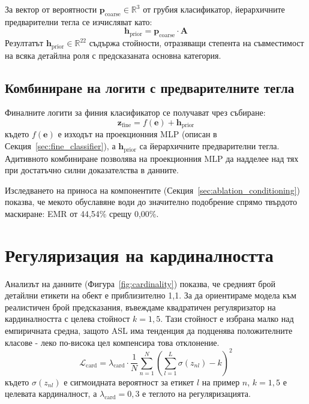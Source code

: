 \documentclass[12pt,a4paper]{report}
\begin{document}
За вектор от вероятности $\mathbf{p}_{\text{coarse}} \in \mathbb{R}^3$ от грубия класификатор, йерархичните предварителни тегла се изчисляват като:
\begin{equation}
  \mathbf{h}_{\text{prior}} = \mathbf{p}_{\text{coarse}} \cdot \mathbf{A}
  \label{eq:hierarchy_prior}
\end{equation}
Резултатът $\mathbf{h}_{\text{prior}} \in \mathbb{R}^{22}$ съдържа стойности, отразяващи степента на съвместимост на всяка детайлна роля с предсказаната основна категория.

\subsection{Комбиниране на логити с предварителните тегла}

Финалните логити за финия класификатор се получават чрез събиране:
\begin{equation}
  \mathbf{z}_{\text{fine}} = f(\mathbf{e}) + \mathbf{h}_{\text{prior}}
  \label{eq:fine_logits}
\end{equation}
където $f(\mathbf{e})$ е изходът на проекционния MLP (описан в Секция~\ref{sec:fine_classifier}), а $\mathbf{h}_{\text{prior}}$ са йерархичните предварителни тегла. Адитивното комбиниране позволява на проекционния MLP да надделее над тях при достатъчно силни доказателства в данните.

Изследването на приноса на компонентите (Секция~\ref{sec:ablation_conditioning}) показва, че мекото обуславяне води до значително подобрение спрямо твърдото маскиране: EMR от 44,54\% срещу 0,00\%.


\section{Регуляризация на кардиналността}
\label{sec:cardinality_reg}

Анализът на данните (Фигура~\ref{fig:cardinality}) показва, че средният брой детайлни етикети на обект е приблизително 1,1. За да ориентираме модела към реалистичен брой предсказания, въвеждаме квадратичен регуляризатор на кардиналността с целева стойност $k=1{,}5$. Тази стойност е избрана малко над емпиричната средна, защото ASL има тенденция да подценява положителните класове - леко по-висока цел компенсира това отклонение.
\begin{equation}
  \mathcal{L}_{\text{card}} = \lambda_{\text{card}} \cdot \frac{1}{N} \sum_{n=1}^{N} \left( \sum_{l=1}^{L} \sigma(z_{nl}) - k \right)^2
  \label{eq:cardinality_reg}
\end{equation}
където $\sigma(z_{nl})$ е сигмоидната вероятност за етикет $l$ на пример $n$, $k=1{,}5$ е целевата кардиналност, а $\lambda_{\text{card}}=0{,}3$ е теглото на регуляризацията.
\end{document}
